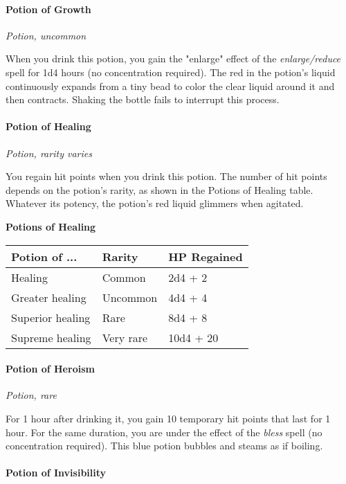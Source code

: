 \documentclass[
]{article}
\begin{document}
\hypertarget{potion-of-growth}{%
\paragraph{Potion of Growth}\label{potion-of-growth}}

\emph{Potion, uncommon}

When you drink this potion, you gain the "enlarge" effect of the
\emph{enlarge/reduce} spell for 1d4 hours (no concentration required).
The red in the potion's liquid continuously expands from a tiny bead to
color the clear liquid around it and then contracts. Shaking the bottle
fails to interrupt this process.

\hypertarget{potion-of-healing}{%
\paragraph{Potion of Healing}\label{potion-of-healing}}

\emph{Potion, rarity varies}

You regain hit points when you drink this potion. The number of hit
points depends on the potion's rarity, as shown in the Potions of
Healing table. Whatever its potency, the potion's red liquid glimmers
when agitated.

\textbf{Potions of Healing}

\begin{longtable}[]{@{}lll@{}}
\toprule
Potion of ... & Rarity & HP Regained\tabularnewline
\midrule
\endhead
Healing & Common & 2d4 + 2\tabularnewline
Greater healing & Uncommon & 4d4 + 4\tabularnewline
Superior healing & Rare & 8d4 + 8\tabularnewline
Supreme healing & Very rare & 10d4 + 20\tabularnewline
\bottomrule
\end{longtable}

\hypertarget{potion-of-heroism}{%
\paragraph{Potion of Heroism}\label{potion-of-heroism}}

\emph{Potion, rare}

For 1 hour after drinking it, you gain 10 temporary hit points that last
for 1 hour. For the same duration, you are under the effect of the
\emph{bless} spell (no concentration required). This blue potion bubbles
and steams as if boiling.

\hypertarget{potion-of-invisibility}{%
\paragraph{Potion of Invisibility}\label{potion-of-invisibility}}
\end{document}
